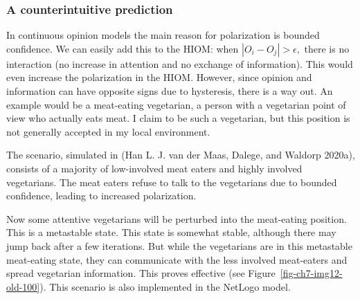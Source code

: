 \documentclass[
  a4paper,
  DIV=11,
  numbers=noendperiod,
  oneside]{scrreprt}
\begin{document}
\hypertarget{sec-A-counterintuitive-prediction}{%
\subsubsection{A counterintuitive
prediction}\label{sec-A-counterintuitive-prediction}}

In continuous opinion models the main reason for polarization is bounded
confidence. We can easily add this to the HIOM: when
\(\left| O_{i} - O_{j} \right| > \epsilon,\) there is no interaction (no
increase in attention and no exchange of information). This would even
increase the polarization in the HIOM. However, since opinion and
information can have opposite signs due to hysteresis, there is a way
out. An example would be a meat-eating vegetarian, a person with a
vegetarian point of view who actually eats meat. I claim to be such a
vegetarian, but this position is not generally accepted in my local
environment.

The scenario, simulated in (Han L. J. van der Maas, Dalege, and Waldorp
2020a), consists of a majority of low-involved meat eaters and highly
involved vegetarians. The meat eaters refuse to talk to the vegetarians
due to bounded confidence, leading to increased polarization.

Now some attentive vegetarians will be perturbed into the meat-eating
position. This is a metastable state. This state is somewhat stable,
although there may jump back after a few iterations. But while the
vegetarians are in this metastable meat-eating state, they can
communicate with the less involved meat-eaters and spread vegetarian
information. This proves effective (see
Figure~\ref{fig-ch7-img12-old-100}). This scenario is also implemented
in the NetLogo model.
\end{document}
